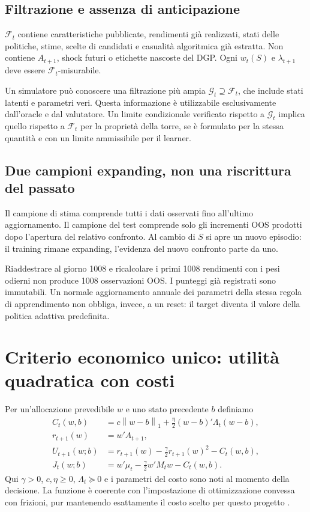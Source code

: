 \documentclass[11pt,a4paper]{article}
\theoremstyle{definition}\newtheorem{definition}[theorem]{Definizione}
\theoremstyle{remark}\newtheorem{remark}[theorem]{Osservazione}
\newcommand{\F}{\mathcal F}\newcommand{\W}{\mathcal W}\newcommand{\supp}{\operatorname{supp}}
\newcommand{\norm}[1]{\left\lVert#1\right\rVert}\newcommand{\abs}[1]{\left|#1\right|}
\begin{document}
\subsection{Filtrazione e assenza di anticipazione}
$\F_t$ contiene caratteristiche pubblicate, rendimenti già realizzati, stati delle politiche, stime, scelte di candidati e casualità algoritmica già estratta. Non contiene $A_{t+1}$, shock futuri o etichette nascoste del DGP. Ogni $w_t(S)$ e $\lambda_{t+1}$ deve essere $\F_t$-misurabile.

Un simulatore può conoscere una filtrazione più ampia $\mathcal G_t\supseteq\F_t$, che include stati latenti e parametri veri. Questa informazione è utilizzabile esclusivamente dall'oracle e dal valutatore. Un limite condizionale verificato rispetto a $\mathcal G_t$ implica quello rispetto a $\F_t$ per la proprietà della torre, se è formulato per la stessa quantità e con un limite ammissibile per il learner.

\subsection{Due campioni expanding, non una riscrittura del passato}
Il campione di stima comprende tutti i dati osservati fino all'ultimo aggiornamento. Il campione del test comprende solo gli incrementi OOS prodotti dopo l'apertura del relativo confronto. Al cambio di $S$ si apre un nuovo episodio: il training rimane expanding, l'evidenza del nuovo confronto parte da uno.

Riaddestrare al giorno 1008 e ricalcolare i primi 1008 rendimenti con i pesi odierni non produce 1008 osservazioni OOS. I punteggi già registrati sono immutabili. Un normale aggiornamento annuale dei parametri della stessa regola di apprendimento non obbliga, invece, a un reset: il target diventa il valore della politica adattiva predefinita.

\section{Criterio economico unico: utilità quadratica con costi}
\label{sec:utility}
Per un'allocazione prevedibile $w$ e uno stato precedente $b$ definiamo
\begin{align}
 C_t(w,b)&=c\norm{w-b}_1+\frac\eta2(w-b)'\Lambda_t(w-b),\label{eq:cost}\\
 r_{t+1}(w)&=w'A_{t+1},\\
 U_{t+1}(w;b)&=r_{t+1}(w)-\frac\gamma2r_{t+1}(w)^2-C_t(w,b),\label{eq:score}\\
 J_t(w;b)&=w'\mu_t-\frac\gamma2w'M_tw-C_t(w,b).\label{eq:J}
\end{align}
Qui $\gamma>0$, $c,\eta\ge0$, $\Lambda_t\succeq0$ e i parametri del costo sono noti al momento della decisione. La funzione è coerente con l'impostazione di ottimizzazione convessa con frizioni, pur mantenendo esattamente il costo scelto per questo progetto \cite{boyd}.
\end{document}
